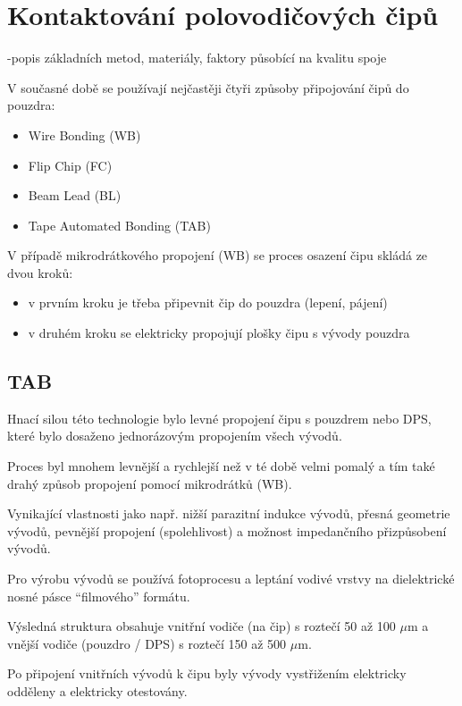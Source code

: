 \section{Kontaktování polovodičových čipů}
-popis základních metod, materiály, faktory působící na kvalitu spoje

V současné době se používají nejčastěji čtyři způsoby připojování čipů do pouzdra:
\begin{itemize}
\item Wire Bonding (WB)
\item Flip Chip (FC)
\item Beam Lead (BL)
\item Tape Automated Bonding (TAB)
\end{itemize}

V případě mikrodrátkového propojení (WB) se proces osazení čipu skládá ze dvou kroků:
\begin{itemize}
\item v prvním kroku je třeba připevnit čip do pouzdra (lepení, pájení)
\item v druhém kroku se elektricky propojují plošky čipu s vývody pouzdra
\end{itemize}

\subsection{TAB}
Hnací silou této technologie bylo levné propojení čipu s pouzdrem nebo DPS, které bylo dosaženo jednorázovým propojením všech vývodů.

Proces byl mnohem levnější a rychlejší než v té době velmi pomalý a tím také drahý způsob propojení pomocí mikrodrátků (WB).

Vynikající vlastnosti jako např. nižší parazitní indukce vývodů, přesná geometrie vývodů, pevnější propojení (spolehlivost) a možnost impedančního přizpůsobení vývodů.

Pro výrobu vývodů se používá fotoprocesu a leptání vodivé vrstvy na dielektrické nosné pásce “filmového” formátu.

Výsledná struktura obsahuje vnitřní vodiče (na čip) s roztečí 50 až 100 $\mu$m a vnější vodiče (pouzdro / DPS) s roztečí 150 až 500 $\mu$m.

Po připojení vnitřních vývodů k čipu byly vývody vystřižením elektricky odděleny a elektricky otestovány.

